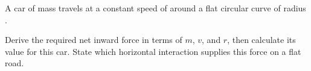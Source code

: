 A car of mass  travels at a constant speed of  around a flat
circular curve of radius .

Derive the required net inward force in terms of $m$, $v$, and $r$, then calculate its value
for this car. State which horizontal interaction supplies this force on a flat road.
